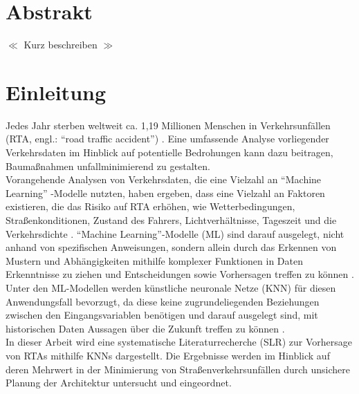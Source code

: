 \documentclass{scrartcl}
\begin{document}

\newpage
\onehalfspacing

\section*{Abstrakt}
$\ll$ Kurz beschreiben $\gg$

\newpage
\tableofcontents
\newpage

\section{Einleitung}

Jedes Jahr sterben weltweit ca. 1,19 Millionen Menschen in Verkehrsunfällen
(RTA, engl.: \enquote{road traffic accident}) \cite{who}.
Eine umfassende Analyse vorliegender Verkehrsdaten im Hinblick auf potentielle
Bedrohungen kann dazu beitragen, Baumaßnahmen unfallminimierend zu gestalten.
\medskip \\
Vorangehende Analysen von Verkehrsdaten, die eine Vielzahl an \enquote{Machine Learning}
-Modelle nutzten, haben ergeben, dass eine Vielzahl an Faktoren existieren,
die das Risiko auf RTA erhöhen, wie Wetterbedingungen, Straßenkonditionen,
Zustand des Fahrers, Lichtverhältnisse, Tageszeit und die Verkehrsdichte \cite{das, qian}.
\enquote{Machine Learning}-Modelle (ML) sind darauf ausgelegt, nicht anhand von
spezifischen Anweisungen, sondern allein durch das Erkennen von Mustern und
Abhängigkeiten mithilfe komplexer Funktionen \cite{qian} in Daten Erkenntnisse
zu ziehen und Entscheidungen sowie Vorhersagen treffen zu können \cite{sap}.
\medskip \\
Unter den ML-Modellen werden künstliche neuronale Netze (KNN) für diesen
Anwendungsfall bevorzugt, da diese keine zugrundeliegenden Beziehungen
zwischen den Eingangsvariablen benötigen und darauf ausgelegt sind,
mit historischen Daten Aussagen über die Zukunft treffen zu können
\cite{qian}.
\medskip \\
In dieser Arbeit wird eine systematische Literaturrecherche (SLR) zur Vorhersage
von RTAs mithilfe KNNs dargestellt. Die Ergebnisse werden im Hinblick auf deren
Mehrwert in der Minimierung von Straßenverkehrsunfällen durch unsichere
Planung der Architektur untersucht und eingeordnet.
\end{document}
